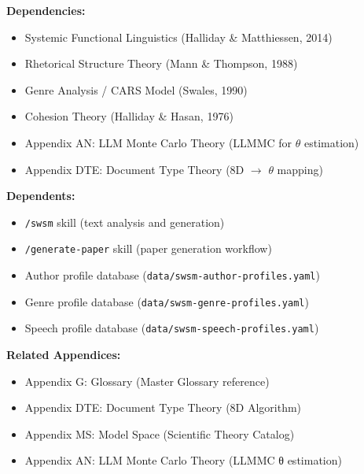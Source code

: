 \begin{tcolorbox}[colback=gray!5!white, colframe=gray!75!black, title=Cross-Reference Map]
\textbf{Dependencies:}
\begin{itemize}
    \item Systemic Functional Linguistics (Halliday \& Matthiessen, 2014)
    \item Rhetorical Structure Theory (Mann \& Thompson, 1988)
    \item Genre Analysis / CARS Model (Swales, 1990)
    \item Cohesion Theory (Halliday \& Hasan, 1976)
    \item Appendix AN: LLM Monte Carlo Theory (LLMMC for $\theta$ estimation)
    \item Appendix DTE: Document Type Theory (8D $\rightarrow$ $\theta$ mapping)
\end{itemize}

\textbf{Dependents:}
\begin{itemize}
    \item \texttt{/swsm} skill (text analysis and generation)
    \item \texttt{/generate-paper} skill (paper generation workflow)
    \item Author profile database (\texttt{data/swsm-author-profiles.yaml})
    \item Genre profile database (\texttt{data/swsm-genre-profiles.yaml})
    \item Speech profile database (\texttt{data/swsm-speech-profiles.yaml})
\end{itemize}

\textbf{Related Appendices:}
\begin{itemize}
    \item Appendix G: Glossary (Master Glossary reference)
    \item Appendix DTE: Document Type Theory (8D Algorithm)
    \item Appendix MS: Model Space (Scientific Theory Catalog)
    \item Appendix AN: LLM Monte Carlo Theory (LLMMC θ estimation)
\end{itemize}
\end{tcolorbox}


